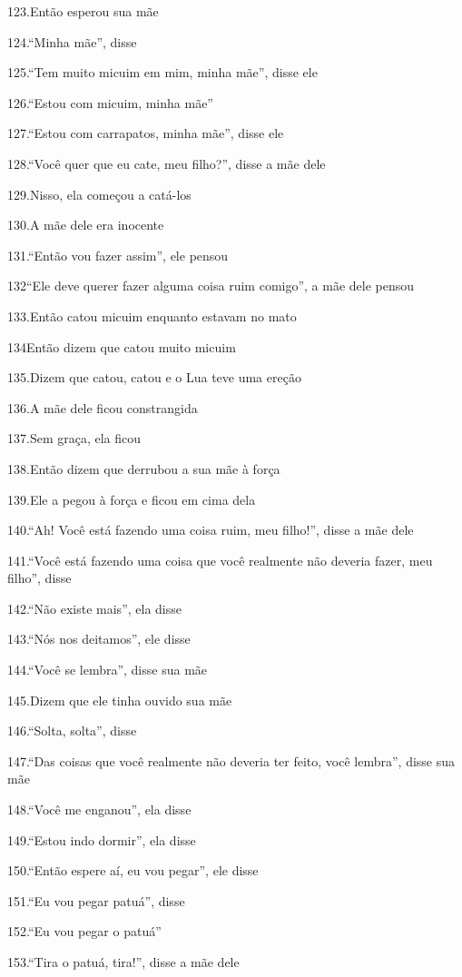 123.Então esperou sua mãe

124.``Minha mãe'', disse

125.``Tem muito micuim em mim, minha mãe'', disse ele

126.``Estou com micuim, minha mãe''

127.``Estou com carrapatos, minha mãe'', disse ele

128.``Você quer que eu cate, meu filho?'', disse a mãe dele

129.Nisso, ela começou a catá-los

130.A mãe dele era inocente

131.``Então vou fazer assim'', ele pensou

132``Ele deve querer fazer alguma coisa ruim comigo'', a mãe dele pensou

133.Então catou micuim enquanto estavam no mato

134Então dizem que catou muito micuim

135.Dizem que catou, catou e o Lua teve uma ereção

136.A mãe dele ficou constrangida

137.Sem graça, ela ficou

138.Então dizem que derrubou a sua mãe à força

139.Ele a pegou à força e ficou em cima dela

140.``Ah! Você está fazendo uma coisa ruim, meu filho!'', disse a mãe
dele

141.``Você está fazendo uma coisa que você realmente não deveria fazer,
meu filho'', disse

142.``Não existe mais'', ela disse

143.``Nós nos deitamos'', ele disse

144.``Você se lembra'', disse sua mãe

145.Dizem que ele tinha ouvido sua mãe

146.``Solta, solta'', disse

147.``Das coisas que você realmente não deveria ter feito, você
lembra'', disse sua mãe

148.``Você me enganou'', ela disse

149.``Estou indo dormir'', ela disse

150.``Então espere aí, eu vou pegar'', ele disse

151.``Eu vou pegar patuá'', disse

152.``Eu vou pegar o patuá''

153.``Tira o patuá, tira!'', disse a mãe dele

